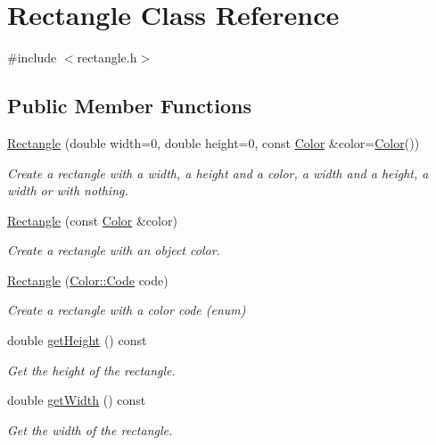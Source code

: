 \hypertarget{classRectangle}{}\section{Rectangle Class Reference}
\label{classRectangle}


{\ttfamily \#include $<$rectangle.\+h$>$}

\subsection*{Public Member Functions}
\begin{DoxyCompactItemize}
\item 
\hyperlink{classRectangle_a66491060fb8ab1dbad9742541c746293}{Rectangle} (double width=0, double height=0, const \hyperlink{classColor}{Color} \&color=\hyperlink{classColor}{Color}())
\begin{DoxyCompactList}\small\item\em Create a rectangle with a width, a height and a color, a width and a height, a width or with nothing. \end{DoxyCompactList}\item 
\hyperlink{classRectangle_acc998437340322592367dee053da3414}{Rectangle} (const \hyperlink{classColor}{Color} \&color)
\begin{DoxyCompactList}\small\item\em Create a rectangle with an object color. \end{DoxyCompactList}\item 
\hyperlink{classRectangle_ad1af7b79e779d6d8765229f2d41107f6}{Rectangle} (\hyperlink{classColor_a20a7b04657c1d83fae5d54514d3f1622}{Color\+::\+Code} code)
\begin{DoxyCompactList}\small\item\em Create a rectangle with a color code (enum) \end{DoxyCompactList}\item 
double \hyperlink{classRectangle_ae2fb8da7f67a36a80d8f789eec63a074}{get\+Height} () const
\begin{DoxyCompactList}\small\item\em Get the height of the rectangle. \end{DoxyCompactList}\item 
double \hyperlink{classRectangle_a0d38078e09cd3151d3009eed3a449660}{get\+Width} () const
\begin{DoxyCompactList}\small\item\em Get the width of the rectangle. \end{DoxyCompactList}\item 

\end{DoxyCompactItemize}
